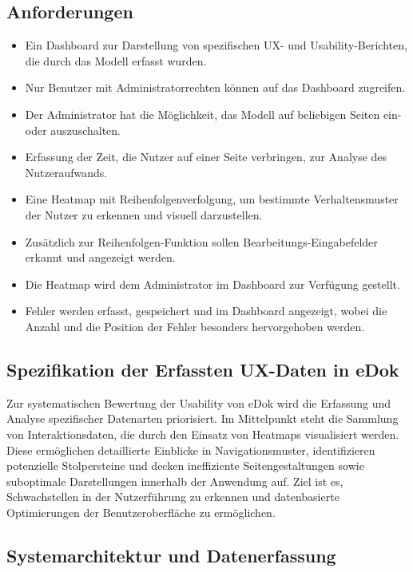 \documentclass[12pt,oneside]{article}
\begin{document}
\subsection{Anforderungen}
\begin{itemize}
\item Ein Dashboard zur Darstellung von spezifischen UX- und Usability-Berichten, die durch das Modell erfasst wurden.
\item Nur Benutzer mit Administratorrechten können auf das Dashboard zugreifen.
\item Der Administrator hat die Möglichkeit, das Modell auf beliebigen Seiten ein- oder auszuschalten.
\item Erfassung der Zeit, die Nutzer auf einer Seite verbringen, zur Analyse des Nutzeraufwands.
\item Eine Heatmap mit Reihenfolgenverfolgung, um bestimmte Verhaltensmuster der Nutzer zu erkennen und visuell   darzustellen.
\item Zusätzlich zur Reihenfolgen-Funktion sollen Bearbeitungs-Eingabefelder erkannt und angezeigt werden.
\item Die Heatmap wird dem Administrator im Dashboard zur Verfügung gestellt.
\item Fehler werden erfasst, gespeichert und im Dashboard angezeigt, wobei die Anzahl und die Position der Fehler besonders hervorgehoben werden.

\end{itemize}
\subsection{Spezifikation der Erfassten UX-Daten in eDok}

Zur systematischen Bewertung der Usability von eDok wird die Erfassung und Analyse spezifischer Datenarten priorisiert. Im Mittelpunkt steht die Sammlung von Interaktionsdaten, die durch den Einsatz von Heatmaps visualisiert werden. Diese ermöglichen detaillierte Einblicke in Navigationsmuster, identifizieren potenzielle Stolpersteine und decken ineffiziente Seitengestaltungen sowie suboptimale Darstellungen innerhalb der Anwendung auf. Ziel ist es, Schwachstellen in der Nutzerführung zu erkennen und datenbasierte Optimierungen der Benutzeroberfläche zu ermöglichen.


\subsection{Systemarchitektur und Datenerfassung}
\end{document}
